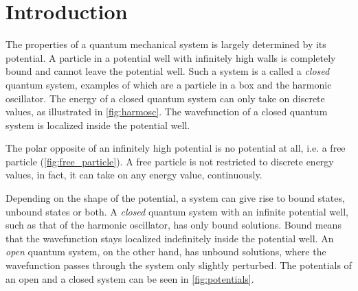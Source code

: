 \documentclass[../main/report.tex]{subfiles}
\begin{document}
\chapter{Introduction}

% 

The properties of a quantum mechanical system is largely determined by its potential. 
A particle in a potential well with infinitely high walls is completely bound and cannot leave the potential well.
Such a system is a called a \emph{closed} quantum system, examples of which are a particle in a box and the harmonic oscillator.
The energy of a closed quantum system can only take on discrete values, as illustrated in \cref{fig:harmosc}.
The wavefunction of a closed quantum system is localized inside the potential well.

The polar opposite of an infinitely high potential is no potential at all, i.e. a free particle (\cref{fig:free_particle}).
A free particle is not restricted to discrete energy values, in fact, it can take on any energy value, continuously.



Depending on the shape of the potential, a system can give rise to bound states, unbound states or both.
A \emph{closed} quantum system with an infinite potential well, such as that of the harmonic oscillator, has only bound solutions. 
Bound means that the wavefunction stays localized indefinitely inside the potential well. 
An \emph{open} quantum system, on the other hand, has unbound solutions, where the wavefunction passes through the system only slightly perturbed. 
The potentials of an open and a closed system can be seen in \cref{fig:potentials}.
\end{document}
